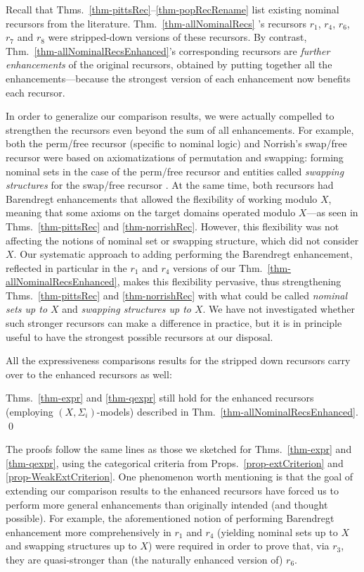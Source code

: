 Recall that Thms.\ \ref{thm-pittsRec}--\ref{thm-popRecRename} list 
existing nominal recursors from the literature. 
Thm.\ \ref{thm-allNominalRecs} 's recursors 
$r_1$, $r_4$, $r_6$, $r_7$ and $r_8$ were stripped-down versions of these recursors. 
By contrast, Thm.\ \ref{thm-allNominalRecsEnhanced}'s corresponding recursors are 
\emph{further enhancements} of the original recursors, obtained by putting together all the 
enhancements---because the strongest version of each enhancement now benefits each recursor.
%

In order to generalize our comparison results, 
we were actually compelled to strengthen the recursors even beyond the sum of all enhancements. For example, both the perm/free recursor (specific to nominal logic) and Norrish's swap/free recursor were based on axiomatizations of permutation and swapping: forming nominal sets in the case of the perm/free recursor and entities called \emph{swapping structures}  for the swap/free recursor \cite{primrecFOAS-Norrish04}. At the same time, both recursors had Barendregt enhancements that allowed the flexibility of working modulo  $X$, meaning that some axioms on the target domains operated modulo $X$---as seen in Thms.\ \ref{thm-pittsRec} and \ref{thm-norrishRec}. However, this flexibility was not affecting the notions of nominal set or swapping structure, which did not consider $X$.  
Our systematic approach to adding performing the Barendregt enhancement, reflected in particular in the $r_1$ and $r_4$ versions of our Thm.\ \ref{thm-allNominalRecsEnhanced}, makes this flexibility pervasive, thus strengthening Thms.\ \ref{thm-pittsRec} and \ref{thm-norrishRec} with what could be called \emph{nominal sets up to $X$} and \emph{swapping structures up to $X$}. 
%
We have not investigated whether such stronger recursors can make a  difference in practice, but it is in principle useful to have the strongest possible recursors at our disposal. 

All the expressiveness comparisons results for the stripped down recursors carry over to the enhanced recursors as well: 

\medskip 
\begin{thm} \rm \label{thm-exprEnhanced} 
	Thms.\ \ref{thm-expr} and \ref{thm-qexpr} still hold for the enhanced recursors 
	(employing $(X,\Sigma_i)$-models) described in Thm.\ \ref{thm-allNominalRecsEnhanced}.  \qed
\end{thm} 
\medskip 

The proofs follow %
the same lines as those we sketched for Thms.\ \ref{thm-expr} and \ref{thm-qexpr}, using the categorical criteria from Props.~\ref{prop-extCriterion} and \ref{prop-WeakExtCriterion}. One phenomenon worth mentioning is that the goal of  extending our comparison results to the enhanced recursors have forced us to perform more general enhancements than originally intended (and thought possible). For example, the aforementioned notion of performing 
Barendregt enhancement more comprehensively in  $r_1$ and $r_4$ (yielding nominal sets up to $X$ and swapping structures up to $X$) were required in order to prove that, via $r_3$, they are quasi-stronger than (the naturally enhanced version of) $r_6$. 



